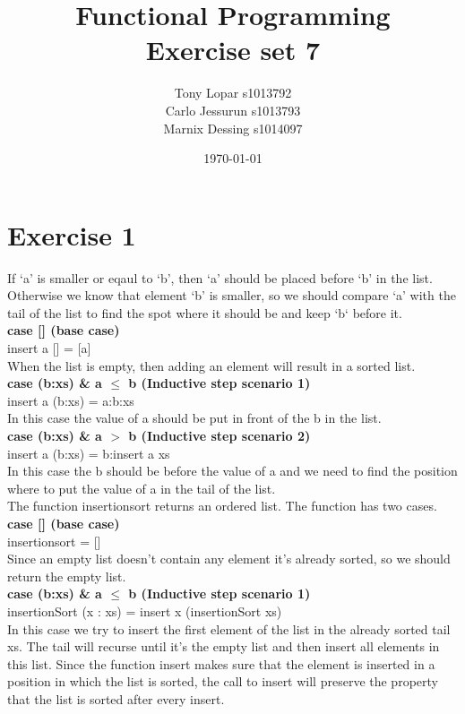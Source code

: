 \documentclass{article}
\begin{document}
\title{Functional Programming \\ Exercise set 7}
\date{\today}
\author{Tony Lopar s1013792 \\ Carlo Jessurun s1013793 \\ Marnix Dessing s1014097}
\maketitle

\section*{Exercise 1}
If `a' is smaller or eqaul to `b', then `a' should be placed before `b' in the list. Otherwise we know that element `b' is smaller, so we should compare `a' with the tail of the list to find the spot where it should be and keep `b` before it. \\
\textbf{case [] (base case)} \\
  insert \enspace a [] = [a] \\
  When the list is empty, then adding an element will result in a sorted list. \\
\textbf{case (b:xs) \& a $\leq$ b (Inductive step scenario 1)} \\
  insert \enspace a (b:xs) = a:b:xs \\
  In this case the value of a should be put in front of the b in the list.\\
\textbf{case (b:xs) \& a $>$ b (Inductive step scenario 2)} \\
  insert \enspace a (b:xs) = b:insert \enspace a \enspace xs \\
  In this case the b should be before the value of a and we need to find the position where to put the value of a in the tail of the list.\\
  \newline
The function insertionsort returns an ordered list. The function has two cases.
\textbf{case [] (base case)} \\
  insertionsort \enspace [] = [] \\
  Since an empty list doesn't contain any element it's already sorted, so we should return the empty list.\\
\textbf{case (b:xs) \& a $\leq$ b (Inductive step scenario 1)} \\
  insertionSort \enspace (x : xs) = insert \enspace  x \enspace (insertionSort xs) \\
  In this case we try to insert the first element of the list in the already sorted tail xs. The tail will recurse until it's the empty list and then insert all elements in this list. Since the function insert makes sure that the element is inserted in a position in which the list is sorted, the call to insert will preserve the property that the list is sorted after every insert.
\end{document}
